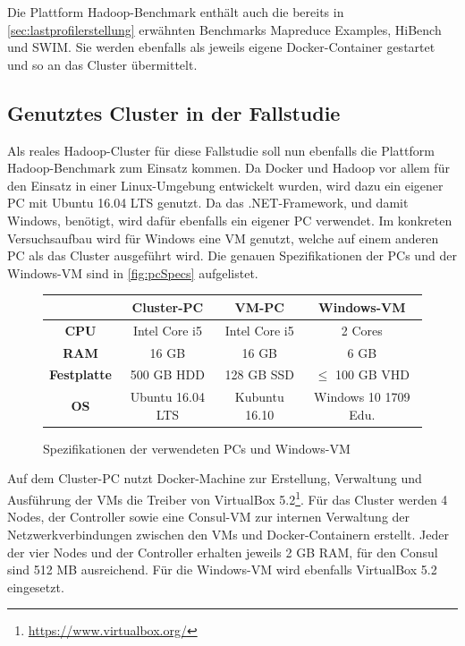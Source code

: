 Die Plattform Hadoop-Benchmark enthält auch die bereits in \autoref{sec:lastprofilerstellung} erwähnten Benchmarks Mapreduce Examples, HiBench und SWIM. Sie werden ebenfalls als jeweils eigene Docker-Container gestartet und so an das Cluster übermittelt.

\subsection{Genutztes Cluster in der Fallstudie}\label{sec:clusterFallstudie}

Als reales Hadoop-Cluster für diese Fallstudie soll nun ebenfalls die Plattform Hadoop-Benchmark zum Einsatz kommen. Da Docker und Hadoop vor allem für den Einsatz in einer Linux-Umgebung entwickelt wurden, wird dazu ein eigener PC mit Ubuntu 16.04 LTS genutzt. Da \sS das .NET-Framework, und damit Windows, benötigt, wird dafür ebenfalls ein eigener PC verwendet. Im konkreten Versuchsaufbau wird für Windows eine VM genutzt, welche auf einem anderen PC als das Cluster ausgeführt wird. Die genauen Spezifikationen der PCs und der Windows-VM sind in \autoref{fig:pcSpecs} aufgelistet.

\begin{figure}
    \centering
    \begin{tabular}{|c|c|c|c|}
    	\hline
    	     \textbf{}      & \textbf{Cluster-PC} & \textbf{VM-PC} & \textbf{Windows-VM}  \\ \hline\hline
    	   \textbf{CPU}     &    Intel Core i5    & Intel Core i5  &       2 Cores        \\ \hline
    	   \textbf{RAM}     &        16 GB        &     16 GB      &         6 GB         \\ \hline
    	\textbf{Festplatte} &     500 GB HDD      &   128 GB SSD   &  $\leq$ 100 GB VHD   \\ \hline
    	    \textbf{OS}     &  Ubuntu 16.04 LTS   & Kubuntu 16.10  & Windows 10 1709 Edu. \\ \hline
    \end{tabular}
    \caption{Spezifikationen der verwendeten PCs und Windows-VM}
    \label{fig:pcSpecs}
\end{figure}

Auf dem Cluster-PC nutzt Docker-Machine zur Erstellung, Verwaltung und Ausführung der VMs die Treiber von VirtualBox 5.2\footnote{\url{https://www.virtualbox.org/}}. Für das Cluster werden 4 Nodes, der Controller sowie eine Consul-VM zur internen Verwaltung der Netzwerkverbindungen zwischen den VMs und Docker-Containern erstellt. Jeder der vier Nodes und der Controller erhalten jeweils 2 GB RAM, für den Consul sind 512 MB ausreichend. Für die Windows-VM wird ebenfalls VirtualBox 5.2 eingesetzt.

